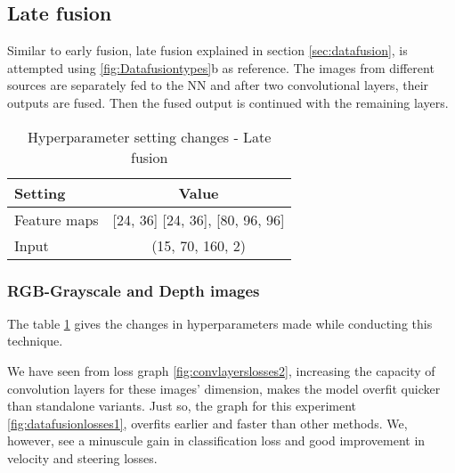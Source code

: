 \subsection{Late fusion}
Similar to early fusion, late fusion explained in section \ref{sec:datafusion}, is attempted
using \ref{fig:Datafusiontypes}b as reference. The images from different sources
are separately fed to the NN and after two convolutional layers,
their outputs are fused. Then the fused output is continued with the remaining layers.
\begin{table}[!ht]
    \centering
\begin{tabular}{lc}
    \toprule
    Setting  & Value  \\\midrule
    Feature maps  & [24, 36] [24, 36], [80, 96, 96]  \\
    Input  & (15, 70, 160, 2)\\\bottomrule
\end{tabular}
\caption{Hyperparameter setting changes - Late fusion}
\label{table:paramsLF}
\end{table}

\subsubsection*{RGB-Grayscale and Depth images}

The table \ref{table:paramsLF} gives the changes in hyperparameters made while conducting
this technique.

We have seen from loss graph \ref{fig:convlayerslosses2}, increasing the capacity of
convolution layers for these images' dimension, makes the model overfit quicker than
standalone variants. Just so, the graph for this experiment \ref{fig:datafusionlosses1},
overfits earlier and faster than other methods. We, however, see a minuscule gain in
classification loss and good improvement in velocity and steering losses.

